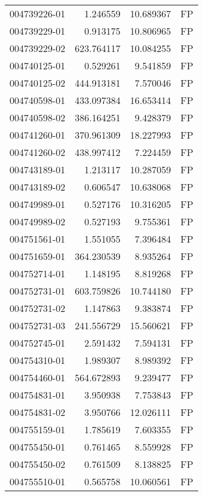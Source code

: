 \begin{tabular}{lrrl}
004739226-01 &    1.246559 &      10.689367 &   FP \\
004739229-01 &    0.913175 &      10.806965 &   FP \\
004739229-02 &  623.764117 &      10.084255 &   FP \\
004740125-01 &    0.529261 &       9.541859 &   FP \\
004740125-02 &  444.913181 &       7.570046 &   FP \\
004740598-01 &  433.097384 &      16.653414 &   FP \\
004740598-02 &  386.164251 &       9.428379 &   FP \\
004741260-01 &  370.961309 &      18.227993 &   FP \\
004741260-02 &  438.997412 &       7.224459 &   FP \\
004743189-01 &    1.213117 &      10.287059 &   FP \\
004743189-02 &    0.606547 &      10.638068 &   FP \\
004749989-01 &    0.527176 &      10.316205 &   FP \\
004749989-02 &    0.527193 &       9.755361 &   FP \\
004751561-01 &    1.551055 &       7.396484 &   FP \\
004751659-01 &  364.230539 &       8.935264 &   FP \\
004752714-01 &    1.148195 &       8.819268 &   FP \\
004752731-01 &  603.759826 &      10.744180 &   FP \\
004752731-02 &    1.147863 &       9.383874 &   FP \\
004752731-03 &  241.556729 &      15.560621 &   FP \\
004752745-01 &    2.591432 &       7.594131 &   FP \\
004754310-01 &    1.989307 &       8.989392 &   FP \\
004754460-01 &  564.672893 &       9.239477 &   FP \\
004754831-01 &    3.950938 &       7.753843 &   FP \\
004754831-02 &    3.950766 &      12.026111 &   FP \\
004755159-01 &    1.785619 &       7.603355 &   FP \\
004755450-01 &    0.761465 &       8.559928 &   FP \\
004755450-02 &    0.761509 &       8.138825 &   FP \\
004755510-01 &    0.565758 &      10.060561 &   FP \\

\end{tabular}
